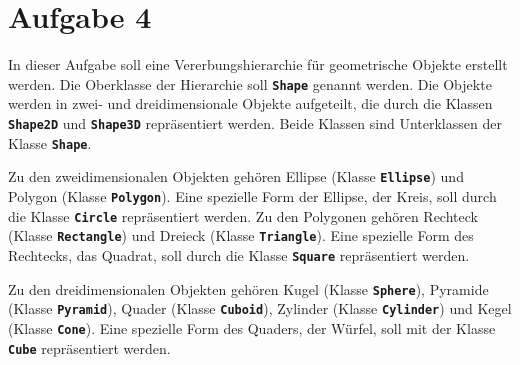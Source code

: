 \documentclass[12pt]{article}
\begin{document}
\section*{Aufgabe 4}

In dieser Aufgabe soll eine Vererbungshierarchie für geometrische Objekte erstellt werden. Die Oberklasse der Hierarchie soll \texttt{\textbf{Shape}} genannt werden. Die Objekte werden in zwei- und dreidimensionale Objekte aufgeteilt, die durch die Klassen \texttt{\textbf{Shape2D}} und \texttt{\textbf{Shape3D}} repräsentiert werden. Beide Klassen sind Unterklassen der Klasse \texttt{\textbf{Shape}}.

Zu den zweidimensionalen Objekten gehören Ellipse (Klasse \texttt{\textbf{Ellipse}}) und Polygon (Klasse \texttt{\textbf{Polygon}}). Eine spezielle Form der Ellipse, der Kreis, soll durch die Klasse \texttt{\textbf{Circle}} repräsentiert werden. Zu den Polygonen gehören Rechteck (Klasse \texttt{\textbf{Rectangle}}) und Dreieck (Klasse \texttt{\textbf{Triangle}}). Eine spezielle Form des Rechtecks, das Quadrat, soll durch die Klasse \texttt{\textbf{Square}} repräsentiert werden.

Zu den dreidimensionalen Objekten gehören Kugel (Klasse \texttt{\textbf{Sphere}}), Pyramide (Klasse \texttt{\textbf{Pyramid}}), Quader (Klasse \texttt{\textbf{Cuboid}}), Zylinder (Klasse \texttt{\textbf{Cylinder}}) und Kegel (Klasse \texttt{\textbf{Cone}}). Eine spezielle Form des Quaders, der Würfel, soll mit der Klasse \texttt{\textbf{Cube}} repräsentiert werden.
\end{document}
